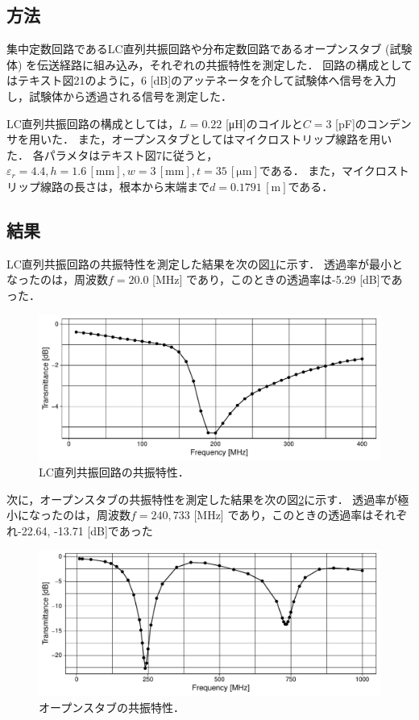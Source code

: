 \documentclass[uplatex,dvipdfmx,a4j,12pt]{jsarticle}
\begin{document}
\subsection{方法}
集中定数回路であるLC直列共振回路や分布定数回路であるオープンスタブ (試験体) を伝送経路に組み込み，それぞれの共振特性を測定した．
回路の構成としてはテキスト図21のように，6 [dB]のアッテネータを介して試験体へ信号を入力し，試験体から透過される信号を測定した．

LC直列共振回路の構成としては，$L = 0.22$ [\si{\micro \henry}]のコイルと$C = 3$ [\si{\pico \farad}]のコンデンサを用いた． 
また，オープンスタブとしてはマイクロストリップ線路を用いた．
各パラメタはテキスト図7に従うと，$\varepsilon_r = 4.4, h = 1.6\mathrm{\,[mm]}, w = 3\mathrm{\,[mm]}, t = 35\mathrm{\,[\mu m]}$である．
また，マイクロストリップ線路の長さは，根本から末端まで$d = 0.1791\mathrm{\,[m]}$である．

\subsection{結果}
LC直列共振回路の共振特性を測定した結果を次の図\ref{fig:3-1}に示す．
透過率が最小となったのは，周波数$f = 20.0$ [MHz] であり，このときの透過率は-5.29 [dB]であった．
\begin{figure}[H]
    \centering
    \includegraphics[width=\linewidth]{data/3_1/transmittance.pdf}
    \caption{LC直列共振回路の共振特性．}
    \label{fig:3-1}
\end{figure}

次に，オープンスタブの共振特性を測定した結果を次の図\ref{fig:3-2}に示す．
透過率が極小になったのは，周波数$f = 240, 733$ [MHz] であり，このときの透過率はそれぞれ-22.64, -13.71 [dB]であった
\begin{figure}[H]
    \centering
    \includegraphics[width=\linewidth]{data/3_2/transmittance.pdf}
    \caption{オープンスタブの共振特性．}
    \label{fig:3-2}
\end{figure}
\end{document}
